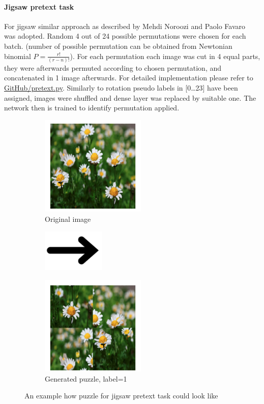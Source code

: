 \paragraph{Jigsaw pretext task}
For jigsaw similar approach as described by Mehdi Noroozi and Paolo Favaro~\cite{DBLP:journals/corr/NorooziF16} was adopted.
Random 4 out of 24 possible permutations were chosen for each batch.
(number of possible permutation can be obtained from Newtonian binomial $P=\frac{r!}{(r-n)!}$).
For each permutation each image was cut in 4 equal parts, they were afterwards permuted according to chosen permutation,
and concatenated in 1 image afterwards.
For detailed implementation please refer to \href{https://github.com/Goofy-Goof/ISS/blob/33a2ad40b779ff230aae31c29d2edc2cf5d90406/impl/util/pretext.py}{GitHub/pretext.py}.
Similarly to rotation pseudo labels in [0\ldots23] have been assigned, images were shuffled and dense layer was replaced by suitable one.
The network then is trained to identify permutation applied.
\\
\begin{figure}
    \begin{subfigure}{0.33\textwidth}
        \caption{Original image}
        \includegraphics[width=5cm]{images/dandelion}
    \end{subfigure}
    \begin{subfigure}{0.2\textwidth}
        \includegraphics[width=3cm]{images/arrow}
    \end{subfigure}
    \begin{subfigure}{0.33\textwidth}
        \caption{Generated puzzle, label=1}
        \includegraphics[width=5cm]{images/puzzle}
    \end{subfigure}
    \caption{An example how puzzle for jigsaw pretext task could look like}
\end{figure}

